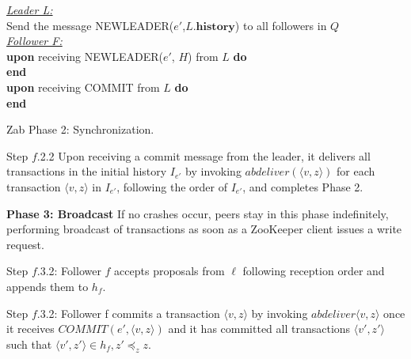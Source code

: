 \documentclass[10pt,onecolumn]{article}
\begin{document}
\begin{algorithm}[H]
  \SetAlgoNoLine
  \textit{\underline{Leader L:}} \\
  Send the message NEWLEADER($e'$,$L.\mathbf{history}$) to all followers in $Q$ \\
  \textit{\underline{Follower F:}} \\
  \textbf{upon} receiving NEWLEADER($e'$, $H$) from $L$ \textbf{do} \\
    \Indp
  \Indm
  \textbf{end} \\
  \textbf{upon} receiving COMMIT from $L$ \textbf{do} \\
    \Indp
  \Indm
  \textbf{end}
\caption{Zab Phase 2: Synchronization.}
\label{alg:phase2}
\end{algorithm}

Step $f$.2.2 Upon receiving a commit message from the leader, it delivers all transactions in the initial history $I_{e'}$ by invoking $abdeliver(\langle v,z \rangle)$ for each transaction $\langle v,z \rangle$ in $I_{e'}$, following the order of $I_{e'}$, and completes Phase 2.

\textbf{Phase 3: Broadcast} If no crashes occur, peers stay in this phase indefinitely, performing broadcast of transactions as soon as a ZooKeeper client issues a write request.

Step $f$.3.2: Follower $f$ accepts proposals from $\ell$ following reception order and appends them to $h_f$.

Step $f$.3.2: Follower f commits a transaction $\langle v,z \rangle$ by invoking $abdeliver \langle v,z \rangle$ once it receives $COMMIT(e',\langle v,z \rangle)$ and it has committed all transactions $\langle v',z' \rangle$ such that $\langle v', z' \rangle \in h_f, z' \preceq_{z} z$.



\end{document}
